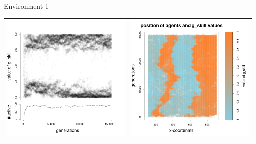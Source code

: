 \documentclass[8pt, handout=show,notes=show]{beamer}
\begin{document}
\begin{frame}{Environment 1}
\begin{table}[H]
\centering
\begin{tabular}{cc}
 \newline
 \includegraphics[width=\imgSize]{../images/5StaticEnv/Gplot29_staticEnv1}&\includegraphics[width=\imgSize]{../images/5StaticEnv/Gplot29Static_staticEnv1}\\

\end{tabular}
\end{table}
\end{frame}
\end{document}
